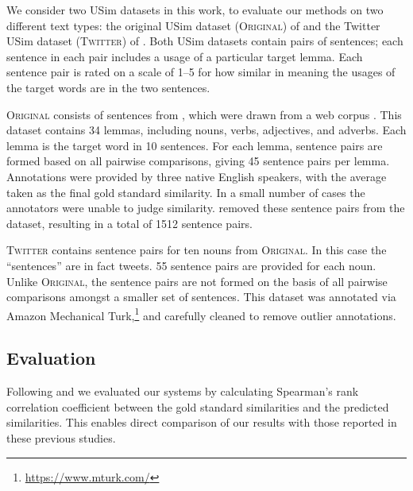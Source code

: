 \documentclass[11pt]{article}
\newcommand\original{\textsc{Original}\xspace}
\newcommand\twitter{\textsc{Twitter}\xspace}
\begin{document}
We consider two USim datasets in this work, to evaluate our methods on
two different text types: the original USim dataset (\original) of
\cite{Erk2009b} and the Twitter USim dataset (\twitter) of
\cite{Gella+:2013}. Both USim datasets contain pairs of sentences;
each sentence in each pair includes a usage of a particular target
lemma. Each sentence pair is rated on a scale of 1--5 for how similar
in meaning the usages of the target words are in the two sentences.

\original consists of sentences from \cite{McCarthy:Navigli:2007},
which were drawn from a web corpus \citep{Sharoff2006b}. This dataset
contains 34 lemmas, including nouns, verbs, adjectives, and
adverbs. Each lemma is the target word in 10 sentences. For each
lemma, sentence pairs are formed based on all pairwise comparisons,
giving 45 sentence pairs per lemma. Annotations were provided by three
native English speakers, with the average taken as the final gold
standard similarity. In a small number of cases the annotators were
unable to judge similarity. \citeauthor{Erk2009b} removed these
sentence pairs from the dataset, resulting in a total of 1512 sentence
pairs.

\twitter contains sentence pairs for ten nouns from \original. In this
case the ``sentences'' are in fact tweets. 55 sentence pairs are
provided for each noun. Unlike \original, the sentence pairs are not
formed on the basis of all pairwise comparisons amongst a smaller set
of sentences. This dataset was annotated via Amazon Mechanical
Turk,\footnote{\url{https://www.mturk.com/}} and carefully cleaned to
remove outlier annotations.







\subsection{Evaluation\label{sec:evaluation}}
Following \cite{LuiBaldwin2012} and \cite{Gella+:2013} we evaluated
our systems by calculating Spearman's rank correlation coefficient
between the gold standard similarities and the predicted
similarities. This enables direct comparison of our results with those
reported in these previous studies.
\end{document}
